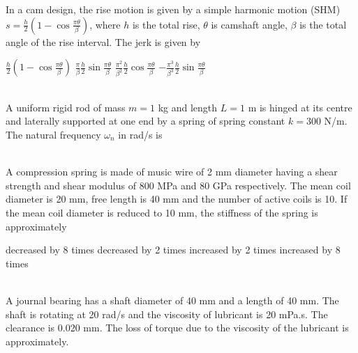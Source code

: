 \documentclass[addpoints,11pt]{exam}
\begin{document}
\begin{questions}
        \question In a cam design, the rise motion is given by a simple harmonic motion (SHM) $s=\frac{h}{2}(1-\cos\frac{\pi\theta}{\beta})$, where $h$ is the total rise, $\theta$ is camshaft angle, $\beta$ is the total angle of the rise interval. The jerk is given by\\

        \begin{oneparchoices}
            \choice $\frac{h}{2}(1-\cos\frac{\pi\theta}{\beta})$
            \choice $\frac{\pi}{\beta}\frac{h}{2}\sin\frac{\pi\theta}{\beta}$
            \choice $\frac{\pi^2}{\beta^2}\frac{h}{2}\cos\frac{\pi\theta}{\beta}$
            \choice $-\frac{\pi^3}{\beta^3}\frac{h}{2}\sin\frac{\pi\theta}{\beta}$
        \end{oneparchoices}\\

        \question A uniform rigid rod of mass $m=1$ kg and length $L=1$ m is hinged at its centre and laterally supported at one end by a spring of spring constant $k=300$ N/m. The natural frequency $\omega_n$ in rad/s is\\

        \begin{oneparchoices}
        \end{oneparchoices}\\

        \question A compression spring is made of music wire of 2 mm diameter having a shear strength and shear modulus of 800 MPa and 80 GPa respectively. The mean coil diameter is 20 mm, free length is 40 mm and the number of active coils is 10. If the mean coil diameter is reduced to 10 mm, the stiffness of the spring is approximately\\

        \begin{oneparchoices}
            \choice decreased by 8 times
            \choice decreased by 2 times
            \choice increased by 2 times
            \choice increased by 8 times
        \end{oneparchoices}\\

        \question A journal bearing has a shaft diameter of 40 mm and a length of 40 mm. The shaft is rotating at 20 rad/s and the viscosity of lubricant is 20 mPa.s. The clearance is 0.020 mm. The loss of torque due to the viscosity of the lubricant is approximately.\\


\end{questions}
\end{document}
